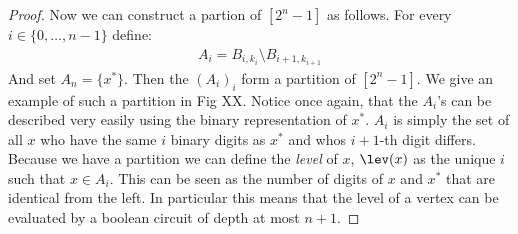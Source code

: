 \begin{proof}
    Now we can construct a partion of $[2^n-1]$ as follows. For every $i \in \{0, \dots, n-1\}$ define:
    \begin{align*}
        A_i = B_{i, k_{i}} \setminus B_{i+1, k_{i+1}}
    \end{align*}
    And set $A_n = \{x^*\}$. Then the $(A_i)_i$ form a partition of $[2^n -1]$.
    We give an example of such a partition in Fig XX.
    Notice once again, that the $A_i$'s can be described very easily using the binary representation of $x^*$. $A_i$ is simply the set of all $x$ who have the
    same $i$ binary digits as $x^*$ and whos $i+1$-th digit differs.
    Because we have a partition we can define the \emph{level} of $x$, $\lev(x)$ as the unique $i$ such that $x \in A_i$.
    This can be seen as the number of digits of $x$ and $x^*$ that are identical from the left.
    In particular this means that the level of a vertex can be evaluated by a boolean circuit of depth at most $n+1$.


\end{proof}
